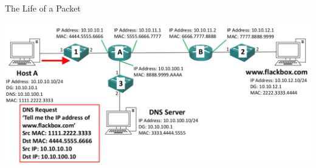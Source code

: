 \documentclass[pdflatex,compress,mathserif]{beamer}
\begin{document}
\begin{frame}{The Life of a Packet}
	\begin{center}
		\includegraphics[width=\linewidth]{img/img21}
	\end{center}
\end{frame}
\end{document}
